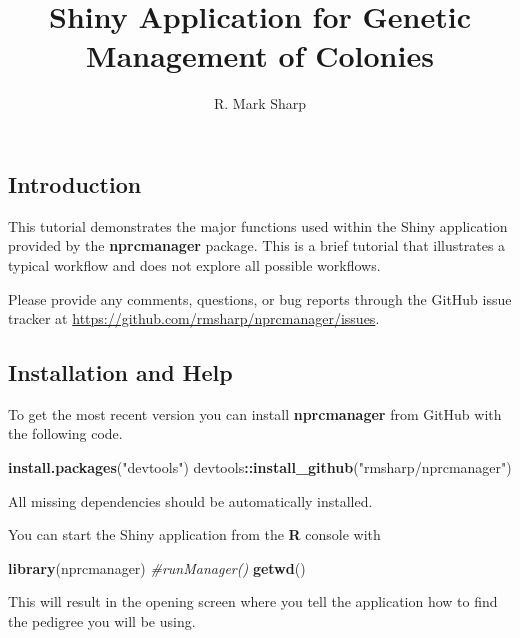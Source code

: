 \documentclass[
]{article}
\title{Shiny Application for Genetic Management of Colonies}
\author{R. Mark Sharp}
\date{}
\newenvironment{Shaded}{\begin{snugshade}}{\end{snugshade}}
\newcommand{\CommentTok}[1]{\textcolor[rgb]{0.56,0.35,0.01}{\textit{#1}}}
\newcommand{\KeywordTok}[1]{\textcolor[rgb]{0.13,0.29,0.53}{\textbf{#1}}}
\newcommand{\NormalTok}[1]{#1}
\newcommand{\OperatorTok}[1]{\textcolor[rgb]{0.81,0.36,0.00}{\textbf{#1}}}
\newcommand{\StringTok}[1]{\textcolor[rgb]{0.31,0.60,0.02}{#1}}
\begin{document}
\maketitle

\hypertarget{introduction}{%
\subsection{Introduction}\label{introduction}}

This tutorial demonstrates the major functions used within the Shiny
application provided by the \textbf{nprcmanager} package. This is a
brief tutorial that illustrates a typical workflow and does not explore
all possible workflows.

Please provide any comments, questions, or bug reports through the
GitHub issue tracker at
\url{https://github.com/rmsharp/nprcmanager/issues}.

\hypertarget{installation-and-help}{%
\subsection{Installation and Help}\label{installation-and-help}}

To get the most recent version you can install \textbf{nprcmanager} from
GitHub with the following code.

\begin{Shaded}
\begin{Highlighting}[]
\KeywordTok{install.packages}\NormalTok{(}\StringTok{"devtools"}\NormalTok{)}
\NormalTok{devtools}\OperatorTok{::}\KeywordTok{install_github}\NormalTok{(}\StringTok{"rmsharp/nprcmanager"}\NormalTok{)}
\end{Highlighting}
\end{Shaded}

All missing dependencies should be automatically installed.

You can start the Shiny application from the \textbf{R} console with

\begin{Shaded}
\begin{Highlighting}[]
\KeywordTok{library}\NormalTok{(nprcmanager)}
\CommentTok{#runManager()}
\KeywordTok{getwd}\NormalTok{()}
\end{Highlighting}
\end{Shaded}

This will result in the opening screen where you tell the application
how to find the pedigree you will be using.
\end{document}
